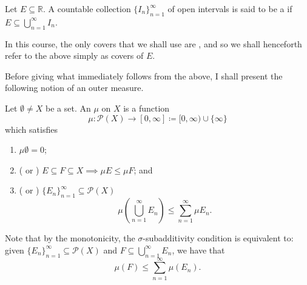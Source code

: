 \documentclass[notoc,notitlepage]{tufte-book}
\begin{document}
\begin{defn}\label{defn:cover_by_open_intervals}
  Let $E \subseteq \mathbb{R}$. A countable collection $\{ I_n
  \}_{n=1}^{\infty}$ of open intervals is said to be a  if $E \subseteq \bigcup_{n=1}^{\infty} I_n$.
\end{defn}

\begin{note}
  In this course, the only covers that we shall use are , and so we shall henceforth refer to the above simply as covers of
  $E$.
\end{note}

Before giving what immediately follows from the above, I shall present the
following notion of an outer measure.

\begin{defn}\label{defn:outer_measure}
  Let $\emptyset \neq X$ be a set. An  $\mu$ on $X$ is a
  function
  \begin{equation*}
    \mu : \mathcal{P}(X) \to [0, \infty] \coloneqq [0, \infty) \cup \{ \infty \}
  \end{equation*}
  which satisfies
  \begin{enumerate}
    \item $\mu \emptyset = 0$;
    \item ( or ) $E \subseteq F
      \subseteq X \implies \mu E \leq \mu F$; and
    \item ( or
      ) $\{ E_n \}_{n=1}^{\infty} \subseteq
      \mathcal{P}(X)$
       \begin{equation*}
        \mu \left( \bigcup_{n=1}^{\infty} E_n \right) \leq \sum_{n=1}^{\infty}
        \mu E_n.
      \end{equation*}
  \end{enumerate}
\end{defn}

\begin{note}
  Note that by the monotonicity, the $\sigma$-subadditivity condition is
  equivalent to: given $\{ E_n \}_{n=1}^{\infty} \subseteq \mathcal{P}(X)$ and
  $F \subseteq \bigcup_{n=1}^{\infty} E_n$, we have that
  \begin{equation*}
    \mu(F) \leq \sum_{n=1}^{\infty} \mu(E_n).
  \end{equation*}
\end{note}
\end{document}
